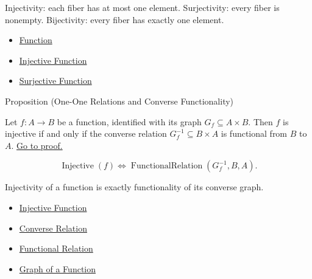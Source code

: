 \begin{remark*}[Exposition]
Injectivity: each fiber has at most one element. Surjectivity: every fiber is
nonempty. Bijectivity: every fiber has exactly one element.
\end{remark*}

\begin{dependencies}
\begin{itemize}
  \item \hyperref[def:function]{Function}
  \item \hyperref[def:injective]{Injective Function}
  \item \hyperref[def:surjective]{Surjective Function}
\end{itemize}
\end{dependencies}

\begin{propositionbox}{Proposition (One-One Relations and Converse Functionality)}
\begin{proposition}\label{prop:one-to-one-converse-functional}
Let $f:A\to B$ be a function, identified with its graph
$G_f\subseteq A\times B$. Then $f$ is injective if and only if the converse
relation $G_f^{-1}\subseteq B\times A$ is functional from $B$ to $A$.
\hyperref[prf:one-to-one-converse-functional]{Go to proof.}
\end{proposition}
\end{propositionbox}

\begin{remark*}
\[
  \operatorname{Injective}(f)
  \iff
  \operatorname{FunctionalRelation}(G_f^{-1},B,A).
\]
\end{remark*}

\begin{remark*}[Interpretation]
Injectivity of a function is exactly functionality of its converse graph.
\end{remark*}

\begin{dependencies}
\begin{itemize}
  \item \hyperref[def:injective]{Injective Function}
  \item \hyperref[def:converse-relation]{Converse Relation}
  \item \hyperref[def:functional-relation]{Functional Relation}
  \item \hyperref[def:graph]{Graph of a Function}
\end{itemize}
\end{dependencies}

